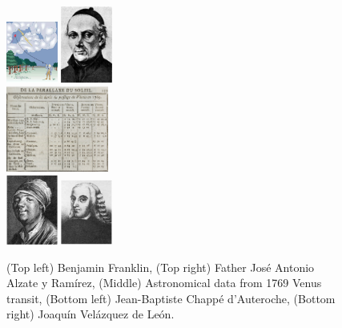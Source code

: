 \documentclass[10pt]{article}
\begin{document}
\begin{figure}[ht]
\centering
\includegraphics[width=0.15\textwidth]{figures/franklin.png}
\includegraphics[width=0.15\textwidth]{figures/alzate_ramirez.jpg} \\
\includegraphics[width=0.30\textwidth]{figures/1769_transit.png} \\
\includegraphics[width=0.15\textwidth]{figures/Abbot_dAuteroche.png}
\includegraphics[width=0.15\textwidth]{figures/joaquin_v_d_Leon.png}
\caption{\label{fig:franklin} \small (Top left) Benjamin Franklin, (Top right) Father Jos\'{e} Antonio Alzate y Ram\'{i}rez, (Middle) Astronomical data from 1769 Venus transit, (Bottom left) Jean-Baptiste Chapp\'{e} d'Auteroche, (Bottom right) Joaqu\'{i}n Vel\'{a}zquez de Le\'{o}n.}
\end{figure}
\end{document}
